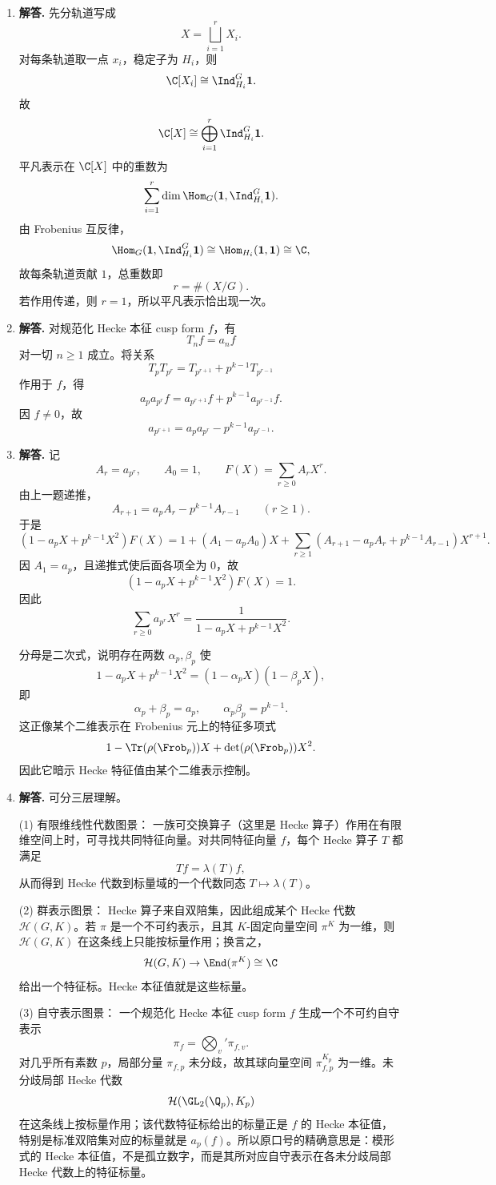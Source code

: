\begin{enumerate}[label=\textbf{\arabic*.}, leftmargin=*, itemsep=1em]
\item \textbf{解答.} 先分轨道写成
\[
X=\bigsqcup_{i=1}^r X_i.
\]
对每条轨道取一点 $x_i$，稳定子为 $H_i$，则
\[
\C[X_i]\cong \Ind_{H_i}^G\mathbf1.
\]
故
\[
\C[X]\cong \bigoplus_{i=1}^r \Ind_{H_i}^G\mathbf1.
\]
平凡表示在 $\C[X]$ 中的重数为
\[
\sum_{i=1}^r \dim\Hom_G(\mathbf1,\Ind_{H_i}^G\mathbf1).
\]
由 Frobenius 互反律，
\[
\Hom_G(\mathbf1,\Ind_{H_i}^G\mathbf1)\cong \Hom_{H_i}(\mathbf1,\mathbf1)\cong \C,
\]
故每条轨道贡献 $1$，总重数即
\[
r=\#(X/G).
\]
若作用传递，则 $r=1$，所以平凡表示恰出现一次。

\item \textbf{解答.} 对规范化 Hecke 本征 cusp form $f$，有
\[
T_nf=a_nf
\]
对一切 $n\ge1$ 成立。将关系
\[
T_pT_{p^r}=T_{p^{r+1}}+p^{k-1}T_{p^{r-1}}
\]
作用于 $f$，得
\[
a_pa_{p^r}f=a_{p^{r+1}}f+p^{k-1}a_{p^{r-1}}f.
\]
因 $f\neq0$，故
\[
a_{p^{r+1}}=a_pa_{p^r}-p^{k-1}a_{p^{r-1}}.
\]

\item \textbf{解答.} 记
\[
A_r=a_{p^r},\qquad A_0=1,\qquad F(X)=\sum_{r\ge0}A_rX^r.
\]
由上一题递推，
\[
A_{r+1}=a_pA_r-p^{k-1}A_{r-1}\qquad (r\ge1).
\]
于是
\[
(1-a_pX+p^{k-1}X^2)F(X)
=1+(A_1-a_pA_0)X+\sum_{r\ge1}(A_{r+1}-a_pA_r+p^{k-1}A_{r-1})X^{r+1}.
\]
因 $A_1=a_p$，且递推式使后面各项全为 $0$，故
\[
(1-a_pX+p^{k-1}X^2)F(X)=1.
\]
因此
\[
\sum_{r\ge0}a_{p^r}X^r=\frac{1}{1-a_pX+p^{k-1}X^2}.
\]

分母是二次式，说明存在两数 $\alpha_p,\beta_p$ 使
\[
1-a_pX+p^{k-1}X^2=(1-\alpha_pX)(1-\beta_pX),
\]
即
\[
\alpha_p+\beta_p=a_p,\qquad \alpha_p\beta_p=p^{k-1}.
\]
这正像某个二维表示在 Frobenius 元上的特征多项式
\[
1-\Tr(\rho(\Frob_p))X+\det(\rho(\Frob_p))X^2.
\]
因此它暗示 Hecke 特征值由某个二维表示控制。

\item \textbf{解答.} 可分三层理解。

\textnormal{(1) 有限维线性代数图景：} 一族可交换算子（这里是 Hecke 算子）作用在有限维空间上时，可寻找共同特征向量。对共同特征向量 $f$，每个 Hecke 算子 $T$ 都满足
\[
Tf=\lambda(T)f,
\]
从而得到 Hecke 代数到标量域的一个代数同态 $T\mapsto\lambda(T)$。

\textnormal{(2) 群表示图景：} Hecke 算子来自双陪集，因此组成某个 Hecke 代数 $\mathcal H(G,K)$。若 $\pi$ 是一个不可约表示，且其 $K$-固定向量空间 $\pi^K$ 为一维，则 $\mathcal H(G,K)$ 在这条线上只能按标量作用；换言之，
\[
\mathcal H(G,K)\to \End(\pi^K)\cong \C
\]
给出一个特征标。Hecke 本征值就是这些标量。

\textnormal{(3) 自守表示图景：} 一个规范化 Hecke 本征 cusp form $f$ 生成一个不可约自守表示
\[
\pi_f=\bigotimes_v' \pi_{f,v}.
\]
对几乎所有素数 $p$，局部分量 $\pi_{f,p}$ 未分歧，故其球向量空间 $\pi_{f,p}^{K_p}$ 为一维。未分歧局部 Hecke 代数
\[
\mathcal H(\GL_2(\Q_p),K_p)
\]
在这条线上按标量作用；该代数特征标给出的标量正是 $f$ 的 Hecke 本征值，特别是标准双陪集对应的标量就是 $a_p(f)$。所以原口号的精确意思是：模形式的 Hecke 本征值，不是孤立数字，而是其所对应自守表示在各未分歧局部 Hecke 代数上的特征标量。
\end{enumerate}
